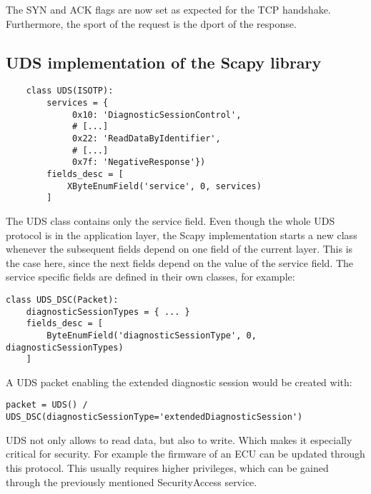 The SYN and ACK flags are now set as expected for the TCP handshake. Furthermore, the sport of the request is the dport of the response.

\subsection{UDS implementation of the Scapy library}

\begin{samepage}
    \begin{verbatim}
    class UDS(ISOTP):
        services = {
             0x10: 'DiagnosticSessionControl',
             # [...]
             0x22: 'ReadDataByIdentifier',
             # [...]
             0x7f: 'NegativeResponse'})
        fields_desc = [
            XByteEnumField('service', 0, services)
        ]
    \end{verbatim}
\end{samepage}
    

The UDS class contains only the service field. Even though the whole UDS protocol is in the application layer, the Scapy implementation starts a new class whenever the subsequent fields depend on one field of the current layer. This is the case here, since the next fields depend on the value of the service field. The service specific fields are defined in their own classes, for example:

\begin{samepage}
\begin{verbatim}
class UDS_DSC(Packet):
    diagnosticSessionTypes = { ... }
    fields_desc = [
        ByteEnumField('diagnosticSessionType', 0,  diagnosticSessionTypes)
    ]
\end{verbatim}
\end{samepage}

A UDS packet enabling the extended diagnostic session would be created with:

\begin{samepage}
\begin{verbatim}
packet = UDS() / UDS_DSC(diagnosticSessionType='extendedDiagnosticSession')
\end{verbatim}
\end{samepage}

UDS not only allows to read data, but also to write. Which makes it especially critical for security. For example the firmware of an ECU can be updated through this protocol. This usually requires higher privileges, which can be gained through the previously mentioned SecurityAccess service.

